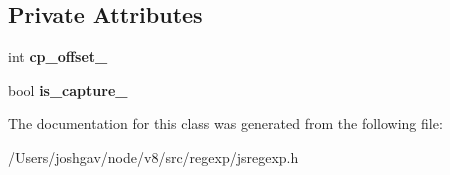 \subsection*{Private Attributes}
\begin{DoxyCompactItemize}
\item 
int {\bfseries cp\+\_\+offset\+\_\+}\hypertarget{classv8_1_1internal_1_1_trace_1_1_deferred_capture_acdb13826e46e14dd3f63b2d69f38c060}{}\label{classv8_1_1internal_1_1_trace_1_1_deferred_capture_acdb13826e46e14dd3f63b2d69f38c060}

\item 
bool {\bfseries is\+\_\+capture\+\_\+}\hypertarget{classv8_1_1internal_1_1_trace_1_1_deferred_capture_aeea06fd0f8c535e2d49b1dd42c047e50}{}\label{classv8_1_1internal_1_1_trace_1_1_deferred_capture_aeea06fd0f8c535e2d49b1dd42c047e50}

\end{DoxyCompactItemize}


The documentation for this class was generated from the following file\+:\begin{DoxyCompactItemize}
\item 
/\+Users/joshgav/node/v8/src/regexp/jsregexp.\+h\end{DoxyCompactItemize}
